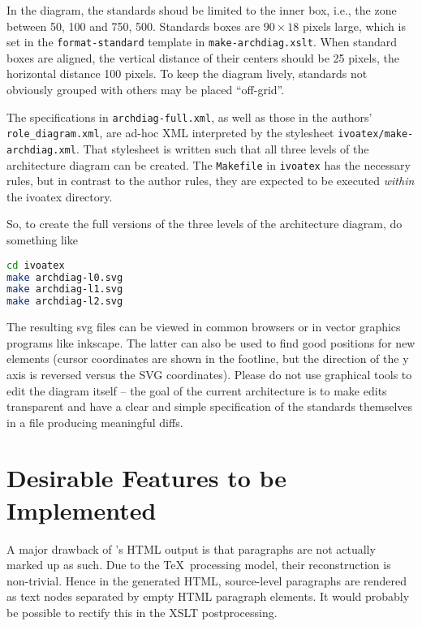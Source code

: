\documentclass[11pt,a4paper]{ivoa}
\begin{document}
In the diagram, the standards shoud be limited to the inner box, i.e.,
the zone between 50, 100 and 750, 500.  Standards boxes are $90\times
18$ pixels large, which is set in the \texttt{format-standard} template
in \texttt{make-archdiag.xslt}.  When standard boxes are aligned, the
vertical distance of their centers should be 25 pixels, the horizontal
distance 100 pixels.  To keep the diagram lively, standards not
obviously grouped with others may be placed ``off-grid''.

The specifications in \texttt{archdiag-full.xml}, as well as those in
the authors' \texttt{role\_diagram.xml}, are ad-hoc XML interpreted by the
stylesheet \texttt{ivoatex/make-archdiag.xml}.  That stylesheet is
written such that all three levels of the architecture diagram can be
created.  The \texttt{Makefile} in \texttt{ivoatex} has the necessary
rules, but in contrast to the author rules, they are expected to be
executed \emph{within} the ivoatex directory.

So, to create the full versions of the three levels of the architecture
diagram, do something like

\begin{lstlisting}[language=sh]
cd ivoatex
make archdiag-l0.svg
make archdiag-l1.svg
make archdiag-l2.svg
\end{lstlisting}

The resulting svg files can be viewed in common browsers or in vector
graphics programs like inkscape.  The latter can also be used to find
good positions for new elements (cursor coordinates are shown in the
footline, but the direction of the y axis is reversed versus the SVG
coordinates).  Please do not use graphical tools to edit the diagram
itself -- the goal of the current architecture is to make edits
transparent and have a clear and simple specification of the standards
themselves in a file producing meaningful diffs.

\section{Desirable Features to be Implemented}

A major drawback of \ivoatex's HTML output is that paragraphs are not actually
marked up as such.  Due to the \TeX\ processing model, their
reconstruction is non-trivial.  Hence in the generated HTML,
source-level paragraphs are rendered as text nodes separated by empty
HTML paragraph elements.  It would probably be possible to rectify this
in the XSLT postprocessing.
\end{document}
